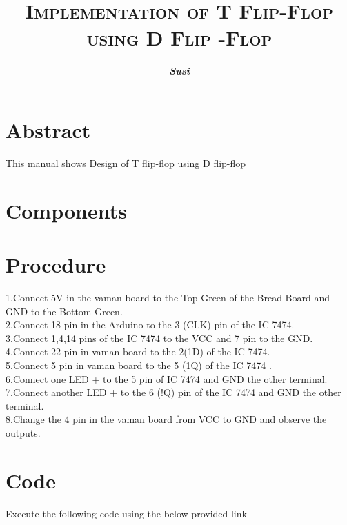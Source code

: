 \documentclass{article}
\title{\textbf{\textsc{Implementation of T Flip-Flop using D Flip -Flop}}}
\author{\textit{\textbf{Susi}}}
\begin{document}
\maketitle
\section{Abstract}
This manual shows Design of T flip-flop using D flip-flop
\section{Components}
\begin{table}[ht]
\caption{}
\label{Tabel-1}
\end{table}
\section{Procedure}
1.Connect 5V  in the vaman board to the Top Green of the Bread Board  and GND to the Bottom Green.
\\
2.Connect 18 pin in the Arduino to the 3 (CLK) pin of the IC 7474.
\\
3.Connect 1,4,14  pins of the IC 7474 to the VCC and 7 pin to the GND.
\\
4.Connect  22 pin in vaman board  to the  2(1D) of the IC 7474.
\\
5.Connect 5  pin in vaman board to the 5 (1Q) of the IC 7474 .
\\
6.Connect one LED + to the 5 pin of IC 7474 and GND the other terminal.
\\
7.Connect another LED +  to the 6 (!Q) pin of the IC 7474 and GND the other terminal.\\
8.Change the 4 pin in the vaman board from VCC to GND and observe the outputs.
\\

\section{Code}
Execute the following code using the below provided link
\\
\begin{table}[ht]
\end{table}
\end{document}

